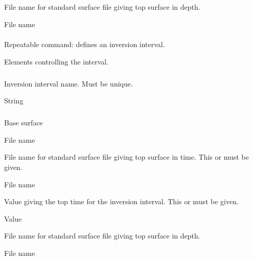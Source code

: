  \subparagraph{} 
 \slist
   \item \Description File name for standard surface file giving top surface in depth.
   \item \Argument File name
   \item \Default
 \elist


\paragraph{ \necessary}  
 \slist
 	\item \Description Repeatable command: defines an inversion interval.
 	\item \Argument Elements controlling the interval.
 	\item \Default
 \elist

 \subparagraph{ \necessary} 
 \slist
   \item \Description Inversion interval name. Must be unique.
   \item \Argument String
   \item \Default
 \elist

\subparagraph{ \necessary} 
 \slist
   \item \Description Base surface
   \item \Argument File name
   \item \Default
 \elist

 
 \slist
   \item \Description File name for standard surface file giving top surface in time. This or  must be given.
   \item \Argument File name
   \item \Default
 \elist

 
 \slist
   \item \Description Value giving the top time for the inversion interval. This or  must be given.
   \item \Argument Value
   \item \Default
 \elist

  
 \slist
   \item \Description File name for standard surface file giving top surface in depth.
   \item \Argument File name
   \item \Default
 \elist

